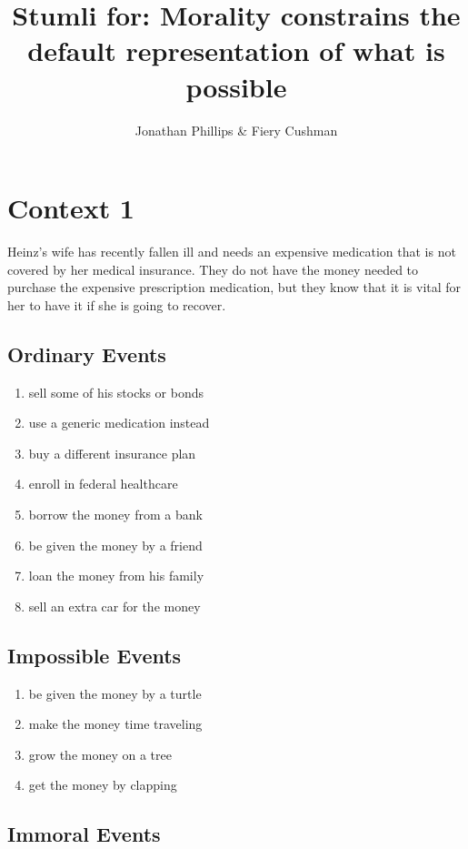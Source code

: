 \documentclass[11pt,letterpaper]{article}
\title{Stumli for: Morality constrains the default representation of what is possible}
\author{Jonathan Phillips \& Fiery Cushman}
\date{}
\begin{document}
\maketitle

\section{Context 1}

Heinz's wife has recently fallen ill and needs an expensive medication that is not covered by her medical insurance. They do not have the money needed to purchase the expensive prescription medication, but they know that it is vital for her to have it if she is going to recover.

\subsection{ Ordinary Events}

\begin{enumerate}
    \item sell some of his stocks or bonds
    \item use a generic medication instead
    \item buy a different insurance plan
    \item enroll in federal healthcare
    \item borrow the money from a bank
    \item be given the money by a friend
    \item loan the money from his family
    \item sell an extra car for the money
\end{enumerate}

\subsection{Impossible Events}

\begin{enumerate}[resume]
    \item be given the money by a turtle
    \item make the money time traveling
    \item grow the money on a tree
    \item get the money by clapping
\end{enumerate}

\subsection{Immoral Events}
\end{document}
